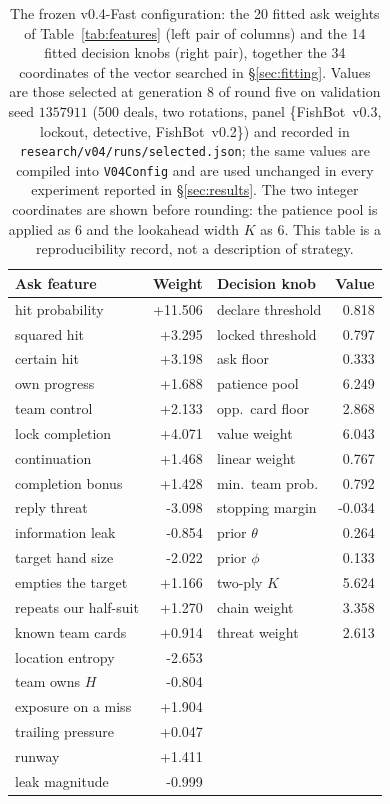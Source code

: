 \documentclass[11pt]{article}
\theoremstyle{definition}
\DeclareRobustCommand{\vfast}{\texorpdfstring{\mbox{v0.4-Fast}}{v0.4-Fast}}
\DeclareRobustCommand{\vthree}{\texorpdfstring{\mbox{FishBot v0.3}}{FishBot v0.3}}
\DeclareRobustCommand{\vtwo}{\texorpdfstring{\mbox{FishBot v0.2}}{FishBot v0.2}}
\newcommand{\numSelectedGen}{8}
\newcommand{\numParams}{34}
\newcommand{\numAskFeats}{20}
\newcommand{\numKnobs}{14}
\begin{document}
\begin{table}[ht]
\centering
\caption{The frozen \vfast{} configuration: the \numAskFeats{} fitted ask weights
of Table~\ref{tab:features} (left pair of columns) and the \numKnobs{} fitted decision
knobs (right pair), together the \numParams{} coordinates of the vector searched
in \S\ref{sec:fitting}. Values are those selected at generation
\numSelectedGen{} of round five on validation seed $1357911$ (500 deals, two
rotations, panel \{\vthree{}, lockout, detective, \vtwo{}\}) and recorded in
\texttt{research/v04/runs/selected.json}; the same values are compiled into
\texttt{V04Config} and are used unchanged in every experiment reported in
\S\ref{sec:results}. The two integer coordinates are shown before
rounding: the patience pool is applied as $6$ and the lookahead width $K$ as $6$.
This table is a reproducibility record, not a description of strategy.}
\label{tab:params}
\footnotesize
\begin{tabular}{lrlr}
\toprule
Ask feature & Weight & Decision knob & Value \\
\midrule
hit probability & +11.506 & declare threshold & 0.818 \\
squared hit & +3.295 & locked threshold & 0.797 \\
certain hit & +3.198 & ask floor & 0.333 \\
own progress & +1.688 & patience pool & 6.249 \\
team control & +2.133 & opp.\ card floor & 2.868 \\
lock completion & +4.071 & value weight & 6.043 \\
continuation & +1.468 & linear weight & 0.767 \\
completion bonus & +1.428 & min.\ team prob. & 0.792 \\
reply threat & -3.098 & stopping margin & -0.034 \\
information leak & -0.854 & prior $\theta$ & 0.264 \\
target hand size & -2.022 & prior $\phi$ & 0.133 \\
empties the target & +1.166 & two-ply $K$ & 5.624 \\
repeats our half-suit & +1.270 & chain weight & 3.358 \\
known team cards & +0.914 & threat weight & 2.613 \\
location entropy & -2.653 &  &  \\
team owns $H$ & -0.804 &  &  \\
exposure on a miss & +1.904 &  &  \\
trailing pressure & +0.047 &  &  \\
runway & +1.411 &  &  \\
leak magnitude & -0.999 &  &  \\
\bottomrule
\end{tabular}%
\end{table}
\end{document}
